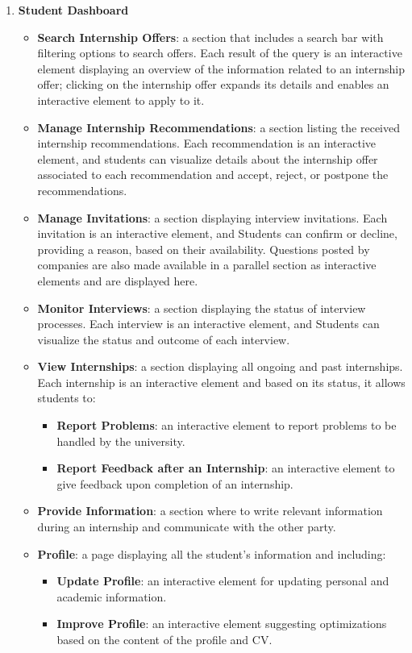\begin{enumerate}
    \item \textbf{Student Dashboard}
    \begin{itemize}
        \item \textbf{Search Internship Offers}: a section that includes a search bar with filtering options to search offers. Each result of the query is an interactive element displaying an overview of the information related to an internship offer; clicking on the internship offer expands its details and enables an interactive element to apply to it.
        \item \textbf{Manage Internship Recommendations}: a section listing the received internship recommendations. Each recommendation is an interactive element, and students can visualize details about the internship offer associated to each recommendation and accept, reject, or postpone the recommendations.
        \item \textbf{Manage Invitations}: a section displaying interview invitations. Each invitation is an interactive element, and Students can confirm or decline, providing a reason, based on their availability. Questions posted by companies are also made available in a parallel section as interactive elements and are displayed here.
        \item \textbf{Monitor Interviews}: a section displaying the status of interview processes. Each interview is an interactive element, and Students can visualize the status and outcome of each interview.
        \item \textbf{View Internships}: a section displaying all ongoing and past internships. Each internship is an interactive element and based on its status, it allows students to:
        \begin{itemize}
            \item \textbf{Report Problems}: an interactive element to report problems to be handled by the university.
            \item \textbf{Report Feedback after an Internship}: an interactive element to give feedback upon completion of an internship.
        \end{itemize}
        \item \textbf{Provide Information}: a section where to write relevant information during an internship and communicate with the other party.
        \item \textbf{Profile}: a page displaying all the student's information and including:
        \begin{itemize}
            \item \textbf{Update Profile}: an interactive element for updating personal and academic information.
            \item \textbf{Improve Profile}: an interactive element suggesting optimizations based on the content of the profile and CV.
        \end{itemize}
    \end{itemize}


\end{enumerate}
